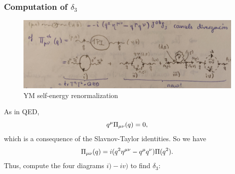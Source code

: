 \subsubsection{Computation of $\delta_3$}
\begin{figure}[h!]
	\centering
	\includegraphics[width=0.5\linewidth]{gfx/YMpictures/YMselfenergy}
	\caption{YM self-energy renormalization}
	\label{fig:ymselfenergy}
\end{figure}
As in QED, \begin{equation}
q^\mu \Pi_{\mu \nu}(q)=0,
\end{equation}
which is a consequence of the Slavnov-Taylor identities. So we have
\begin{equation*}
	\Pi_{\mu \nu}(q)=i (q^2 \eta^{\mu \nu} - q^\mu q^\nu) \Pi(q^2).
\end{equation*}
Thus, compute the four diagrams $i)-iv)$ to find $\delta_3$:
